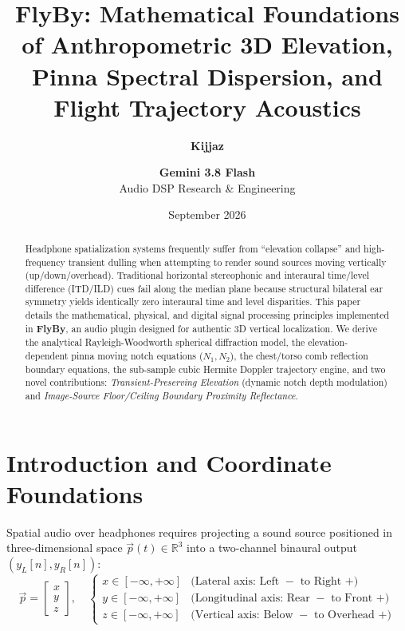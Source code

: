 \documentclass[11pt,a4paper]{article}
\title{\textbf{\Large FlyBy: Mathematical Foundations of Anthropometric 3D Elevation, Pinna Spectral Dispersion, and Flight Trajectory Acoustics}}
\author{\textbf{Kijjaz} \and \textbf{Gemini 3.8 Flash} \\ Audio DSP Research \& Engineering}
\date{September 2026}
\begin{document}
\maketitle

\begin{abstract}
Headphone spatialization systems frequently suffer from ``elevation collapse'' and high-frequency transient dulling when attempting to render sound sources moving vertically (up/down/overhead). Traditional horizontal stereophonic and interaural time/level difference (ITD/ILD) cues fail along the median plane because structural bilateral ear symmetry yields identically zero interaural time and level disparities. This paper details the mathematical, physical, and digital signal processing principles implemented in \textbf{FlyBy}, an audio plugin designed for authentic 3D vertical localization. We derive the analytical Rayleigh-Woodworth spherical diffraction model, the elevation-dependent pinna moving notch equations ($N_1, N_2$), the chest/torso comb reflection boundary equations, the sub-sample cubic Hermite Doppler trajectory engine, and two novel contributions: \emph{Transient-Preserving Elevation} (dynamic notch depth modulation) and \emph{Image-Source Floor/Ceiling Boundary Proximity Reflectance}.
\end{abstract}

\tableofcontents
\newpage

\section{Introduction and Coordinate Foundations}

Spatial audio over headphones requires projecting a sound source positioned in three-dimensional space $\vec{p}(t) \in \mathbb{R}^3$ into a two-channel binaural output $(y_L[n], y_R[n])$:
\begin{equation}
\vec{p} = \begin{bmatrix} x \\ y \\ z \end{bmatrix}, \quad
\begin{cases}
x \in [-\infty, +\infty] & \text{(Lateral axis: Left } - \text{ to Right } +) \\
y \in [-\infty, +\infty] & \text{(Longitudinal axis: Rear } - \text{ to Front } +) \\
z \in [-\infty, +\infty] & \text{(Vertical axis: Below } - \text{ to Overhead } +)
\end{cases}
\end{equation}
\end{document}
